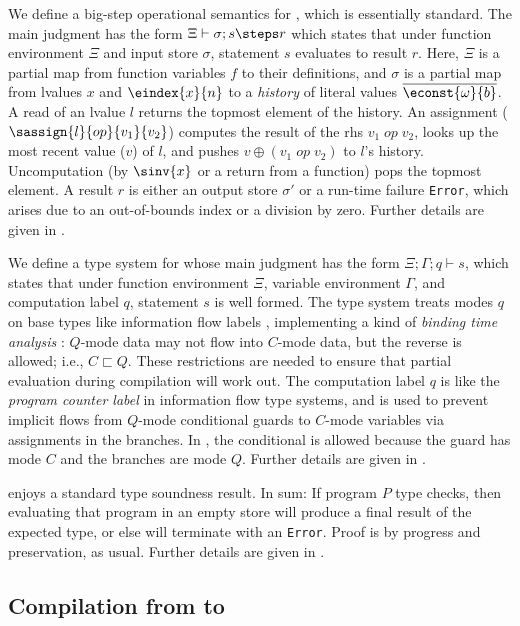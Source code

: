 We define a big-step operational semantics for \vqimp, which is
essentially standard. The main judgment has the form
$\Xi \vdash \sigma; s \steps r$ which states that under function
environment $\Xi$ and input store $\sigma$, statement $s$ evaluates to
result $r$. Here, $\Xi$ is a partial map from function variables $f$
to their definitions, and $\sigma$ is a partial map from lvalues $x$
and $\eindex{x}{n}$ to a \emph{history} of literal
values $\overline{\econst{\omega}{b}}$. A read of an lvalue $l$
returns the topmost element of the history.
An assignment ($\sassign{l}{op}{v_1}{v_2}$) computes the result of the rhs $v_1\;op\;v_2$,
looks up the most recent value ($v$) of $l$, and pushes $v\oplus (v_1\;op\;v_2)$ to $l$'s history.
Uncomputation (by
$\sinv{x}$ or a return from a function) pops the topmost
element. A result $r$ is either an output store $\sigma'$ or a run-time failure
\texttt{Error}, which arises due to an out-of-bounds index or a
division by zero. Further details are given in .

We define a type system for \vqimp whose main judgment has the form
$\Xi;\Gamma; q \vdash s$, which states that under function environment
$\Xi$, variable environment $\Gamma$, and computation label $q$,
statement $s$ is well formed. The type system treats modes $q$ on base
types like information flow labels \cite{Sabelfeld-flow},
implementing a kind of \emph{binding time analysis} \cite{Core_Calculus}: $Q$-mode data may not
flow into $C$-mode data, but the reverse is allowed; i.e.,
$C \sqsubset Q$. These restrictions are needed
to ensure that partial evaluation during compilation will work
out.  The computation label $q$ is like the \emph{program counter
  label} in information flow type systems,
and is used to prevent implicit flows from $Q$-mode conditional guards
to $C$-mode variables via assignments in the branches. In
, the conditional is allowed because the guard has
mode $C$ and the branches are mode $Q$. Further details are given in .

\vqimp enjoys a standard type soundness result. In sum: If \vqimp
program $P$ type checks, then evaluating that program in an empty
store will produce a final result of the expected type, or else will
terminate with an \texttt{Error}. Proof is by progress and
preservation, as usual. Further details are given in .

\subsection{Compilation from \vqimp to \vqir}\label{sec:vqimp-vqir}



